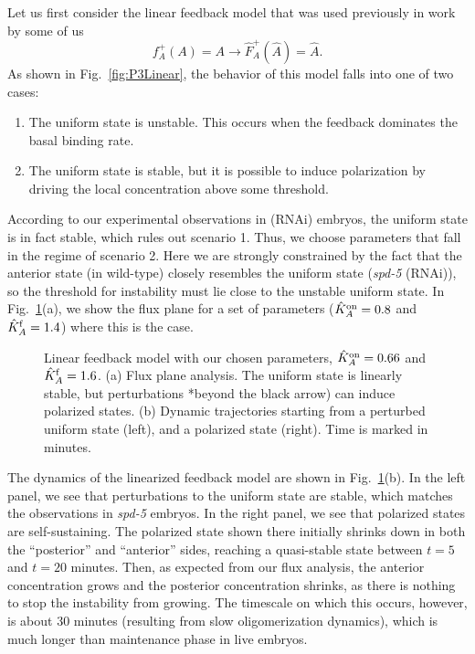 \documentclass[11pt]{article}
\newcommand{\6}[1]{#1_{\text{6}}}
\newcommand{\3}[1]{#1_{\text{3}}}
\begin{document}
Let us first consider the linear feedback model that was used previously in work by some of us \cite{lang2022oligomerization}
\begin{equation}
\label{eq:LinFeed}
f_A^+(A)=A \rightarrow \hat F_A^+(\hat A)=\hat A.
\end{equation}
As shown in Fig.\ \ref{fig:P3Linear}, the behavior of this model falls into one of two cases:
\begin{enumerate}
\item The uniform state is unstable. This occurs when the feedback dominates the basal binding rate. 
\item The uniform state is stable, but it is possible to induce polarization by driving the local concentration above some threshold. 
\end{enumerate}
According to our experimental observations in  (RNAi) embryos, the uniform state is in fact stable, which rules out scenario 1. Thus, we choose parameters that fall in the regime of scenario 2. Here we are strongly constrained by the fact that the anterior state (in wild-type) closely resembles the uniform state (\textit{spd-5} (RNAi)), so the threshold for instability must lie close to the unstable uniform state. In Fig.\ \ref{fig:LinChoice}(a), we show the flux plane for a set of parameters ($\hat{K}^\text{on}_A=0.8$ and $\hat{K}^\text{f}_A=1.4$) where this is the case. 

\begin{figure}
\centering
{}
\caption{\label{fig:LinChoice}Linear feedback model with our chosen parameters, $\hat{K}^\text{on}_A=0.66$ and $\hat{K}^\text{f}_A=1.6$. (a) Flux plane analysis. The uniform state is linearly stable, but perturbations *beyond the black arrow) can induce polarized states. (b) Dynamic trajectories starting from a perturbed uniform state (left), and a polarized state (right). Time is marked in minutes.}
\end{figure}

The dynamics of the linearized feedback model are shown in Fig.\ \ref{fig:LinChoice}(b). In the left panel, we see that perturbations to the uniform state are stable, which matches the observations in \emph{spd-5} embryos. In the right panel, we see that polarized states are self-sustaining. The polarized state shown there initially shrinks down in both the ``posterior'' and ``anterior'' sides, reaching a quasi-stable state between $t=5$ and $t=20$ minutes. Then, as expected from our flux analysis, the anterior concentration grows and the posterior concentration shrinks, as there is nothing to stop the instability from growing. The timescale on which this occurs, however, is about 30 minutes (resulting from slow oligomerization dynamics), which is much longer than maintenance phase in live embryos. 
\end{document}
